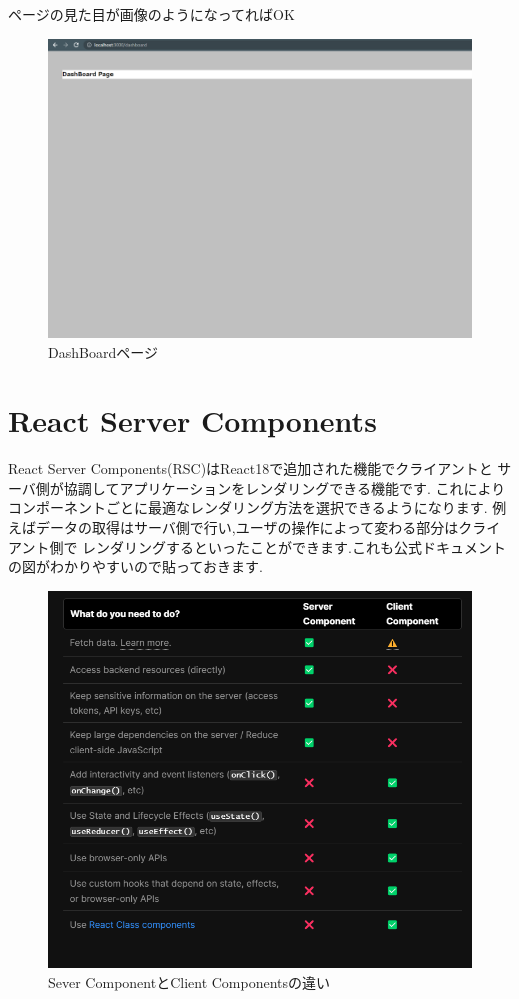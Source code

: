 ページの見た目が画像のようになってればOK


\begin{figure}[H]
  \centering
  \includegraphics[width=12cm]{./image/03-Tech/chap4/03.png}
  \caption{DashBoardページ}
\end{figure}










\section{React Server Components}
React Server Components(RSC)はReact18で追加された機能でクライアントと
サーバ側が協調してアプリケーションをレンダリングできる機能です.
これによりコンポーネントごとに最適なレンダリング方法を選択できるようになります.
例えばデータの取得はサーバ側で行い,ユーザの操作によって変わる部分はクライアント側で
レンダリングするといったことができます.これも公式ドキュメントの図がわかりやすいので貼っておきます.


\begin{figure}[H]
  \centering
  \includegraphics[width=12cm]{./image/03-Tech/chap4/04.png}
  \caption{Sever ComponentとClient Componentsの違い}
\end{figure}



